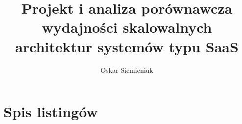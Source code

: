 \documentclass[printmode,mgr,pl]{mgr}
\title{Projekt i analiza porównawcza wydajności skalowalnych architektur systemów typu SaaS}
\author{Oskar Siemieniuk}
\begin{document}


\maketitle

\tableofcontents

\mainmatter









\appendix
\chapter{Spis listingów}



\listoffigures
\listoftables
\end{document}
